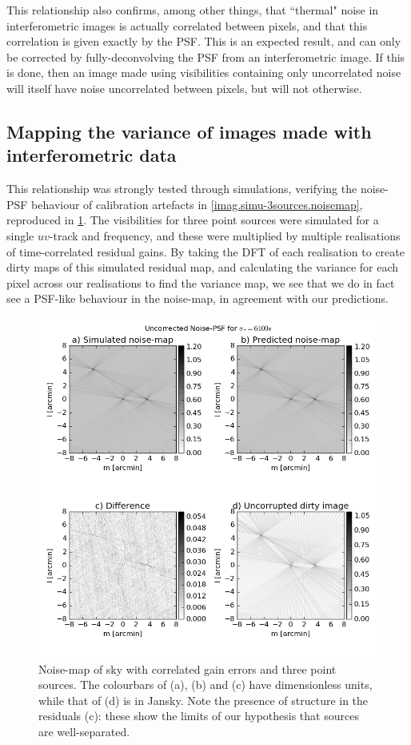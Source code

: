 \pg
This relationship also confirms, among other things, that ``thermal" noise in interferometric images is actually correlated between pixels, and that this correlation is given exactly by the PSF. This is an expected result, and can only be corrected by fully-deconvolving the PSF from an interferometric image. If this is done, then an image made using visibilities containing only uncorrelated noise will itself have noise uncorrelated between pixels, but will not otherwise.


\subsection{Mapping the variance of images made with interferometric data}

\pg
This relationship was strongly tested through simulations, verifying the noise-PSF behaviour of calibration artefacts in \cref{imag.simu-3sources.noisemap}, reproduced in \cref{whatever}. The visibilities for three point sources were simulated for a single $uv$-track and frequency, and these were multiplied by multiple realisations of time-correlated residual gains. By taking the DFT of each realisation to create dirty maps of this simulated residual map, and calculating the variance for each pixel across our realisations to find the variance map, we see that we do in fact see a PSF-like behaviour in the noise-map, in agreement with our predictions.
\begin{figure}[h!]
\centering
\includegraphics[width=\textwidth]{images/Ctime6400-noisePSFandDirty-uncorr.png}
\caption{\label{whatever} {Noise-map of sky with correlated gain errors and three point sources. The colourbars of (a), (b) and (c) have dimensionless units, while that of (d) is in Jansky. Note the presence of structure in the residuals (c): these show the limits of our hypothesis that sources are well-separated.}}
\end{figure}

